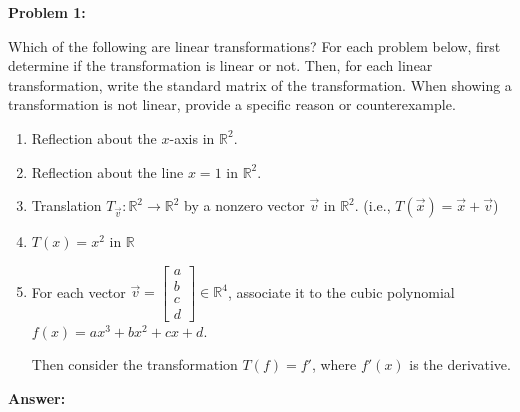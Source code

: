 \documentclass[10pt,letterpaper,final]{report}
\begin{document}
\begin{center}
  \vline
\end{center}

\medskip
\noindent\textbf{Problem 1:}
\medskip

Which of the following are linear transformations? For each problem below, first determine if the transformation is linear or not. Then, for each linear transformation, write the standard matrix of the transformation. When showing a transformation is not linear, provide a specific reason or counterexample.

\begin{enumerate}[label=(\alph*)]
  \item Reflection about the $x$-axis in $\mathbb{R}^2$.
  \item Reflection about the line $x=1$ in $\mathbb{R}^2$.
  \item Translation $T_{\vec{v}}: \mathbb{R}^2 \to \mathbb{R}^2$ by a nonzero vector $\vec{v}$ in $\mathbb{R}^2$. (i.e., $T(\vec{x}) = \vec{x} + \vec{v}$)
  \item $T(x) = x^2$ in $\mathbb{R}$
  \item For each vector $\vec{v} = \begin{bmatrix}a\\b\\c\\d\end{bmatrix} \in \mathbb{R}^4$, associate it to the cubic polynomial $f(x) = ax^3 + bx^2 + cx + d$.

        Then consider the transformation $T(f) = f'$, where $f'(x)$ is the derivative.
\end{enumerate}

\medskip
\noindent\textbf{Answer:}
\end{document}
